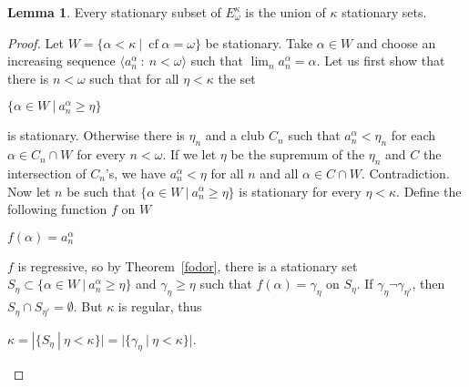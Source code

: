 \documentclass[8pt]{article}
\theoremstyle{definition}
\theoremstyle{definition}
\theoremstyle{definition}
\theoremstyle{definition}
\theoremstyle{definition}
\theoremstyle{definition}
\theoremstyle{definition}
\theoremstyle{definition}
\newtheorem{lemma}{Lemma}[section]
\theoremstyle{definition}
\theoremstyle{definition}
\theoremstyle{definition}
\theoremstyle{definition}
\theoremstyle{definition}
\theoremstyle{definition}
\theoremstyle{question}
\begin{document}
\begin{lemma}
  Every stationary subset of $E_{\omega}^{\kappa}$ is the union of $\kappa$ stationary sets.
\end{lemma}

\begin{proof}
  Let $W = \{ \alpha < \kappa \: | \: \operatorname{cf} \alpha = \omega \}$ be stationary. Take $\alpha \in W$ and
  choose an increasing sequence $\langle a^{\alpha}_n \: : \: n < \omega \rangle$ such that 
  $\lim_n a^{\alpha}_n = \alpha$. Let us first show that there is $n < \omega$ such that for all $\eta < \kappa$ the set
  \begin{center}
    $\{ \alpha \in W \: | \: a^{\alpha}_n \geq \eta \}$
  \end{center}
  is stationary. Otherwise there is $\eta_n$ and a club $C_n$ such that $a^{\alpha}_n < \eta_n$
  for each $\alpha \in C_n \cap W$ for every $n < \omega$. 
  If we let $\eta$ be the supremum of the $\eta_n$ and $C$ the intersection of $C_n$'s,
  we have $a_n^{\alpha} < \eta$ for all $n$ and all $\alpha \in C \cap W$. Contradiction.
  Now let $n$ be such that $\{ \alpha \in W \: | \: a^{\alpha}_n \geq \eta \}$ is stationary 
  for every $\eta < \kappa$. Define the following function $f$ on $W$
  \begin{center}
    $f(\alpha) = a^{\alpha}_n$
  \end{center}
  $f$ is regressive, so by Theorem~\ref{fodor}, there is a stationary set $S_{\eta} \subset \{ \alpha \in W \: | \: a^{\alpha}_n \geq \eta \}$
  and $\gamma_{\eta} \geq \eta$ such that $f(\alpha) = \gamma_{\eta}$ on $S_{\eta}$.
  If $\gamma_{\eta} \neg \gamma_{\eta'}$, then $S_{\eta} \cap S_{\eta'} = \emptyset$. But $\kappa$ is regular, thus
  \begin{center}
    $\kappa = |\{ S_{\eta} \: | \: \eta < \kappa\}| = |\{ \gamma_{\eta} \: | \: \eta < \kappa \}|$.
  \end{center}
\end{proof}



\end{document}
